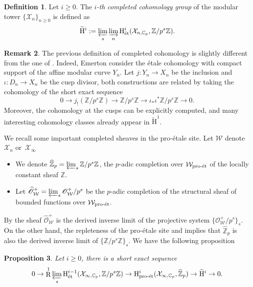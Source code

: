 \documentclass[JEP,XML,SOM,Unicode,published]{cedram}
\newcommand{\et}{\mathrm{\acute{e}t}}
\newcommand{\proet}{\mathrm{pro}\textup{-}\et}
\numberwithin{equation}{section}
\newtheorem{prop}{Proposition}[section]
\theoremstyle{definition}
\newtheorem{definition}[prop]{Definition}
\newtheorem{remark}[prop]{Remark}
\newcommand{\bb}[1]{\mathbb{#1}}
\newcommand{\n}[1]{\mathcal{#1}}
\newcommand{\s}[1]{\mathscr{#1}}
\DeclareMathOperator{\R}{R}
\begin{document}
\begin{definition}
Let $i\geq 0$. The \textit{$i$-th completed cohomology group} of the modular tower $\{\n{X}_n\}_{n\geq 0}$ is defined as\vspace*{-3pt}
\[
\widetilde{\mathrm{H}}^i:= \varprojlim_{s} \varinjlim_{n} \mathrm{H}_{\et}^i(\n{X}_{n,\bb{C}_p}, \bb{Z}/p^s \bb{Z}).
\]
\end{definition}
\begin{remark}
The previous definition of completed cohomology is slightly different from the one of \cite{MR2207783}. Indeed, Emerton consider the étale cohomology with compact support of the affine modular curve $Y_n$. Let $j: Y_n\to X_n$ be the inclusion and $\iota: D_n\to X_n$ be the cusp divisor, both constructions are related by taking the cohomology of the short exact sequence\vspace*{-3pt}
\[
0 \to j_!(\bb{Z}/p^s \bb{Z}) \to \bb{Z}/p^s \bb{Z} \to \iota_* \iota^* \bb{Z}/p^s \bb{Z}\to 0.
\]
Moreover, the cohomology at the cusps can be explicitly computed, and many interesting cohomology classes already appear in $\widetilde{\mathrm{H}}^1$.
\end{remark}

We recall some important completed sheaves in the pro-étale site. Let $\n{W}$ denote~$\n{X}_n$ or~$\n{X}_{\infty}$
\begin{itemize}
\item
We denote $\widehat{\bb{Z}}_p = \varprojlim_s \bb{Z}/p^s\bb{Z}$, the $p$-adic completion over $\n{W}_{\proet}$ of the locally constant sheaf $\bb{Z}$.

\item
Let $\widehat{\s{O}}^+_{\n{W}}= \varprojlim_{s} \s{O}_{\n{W}}^+/p^s$ be the $p$-adic completion of the structural sheaf of bounded functions over $\n{W}_{\proet}$.
\end{itemize}
By \cite[Lem.\,3.18]{MR3090230} the sheaf $\widehat{\s{O}}_{\n{W}}^+$ is the derived inverse limit of the projective system $\{\s{O}_{\n{W}}^+/p^s\}_s$. On the other hand, the repleteness of the pro-étale site and \cite[Prop.\,3.1.10]{bhatt2014proetale} implies that $\widehat{\bb{Z}}_p$ is also the derived inverse limit of $\{\bb{Z}/p^s\bb{Z}\}_{s}$. We have the following proposition

\begin{prop}
\label{PropCompletedCohAndPerf}
Let $i\geq 0$, there is a short exact sequence
\[
0\to \R^1 \varprojlim_s \mathrm{H}^{i-1}_{\et}(\n{X}_{\infty, \bb{C}_p}, \bb{Z}/p^s \bb{Z}) \to \mathrm{H}^i_{\proet}(\n{X}_{\infty, \bb{C}_p}, \widehat{\bb{Z}}_p) \to \widetilde{\mathrm{H}}^i\to 0.
\]
\end{prop}
\end{document}
